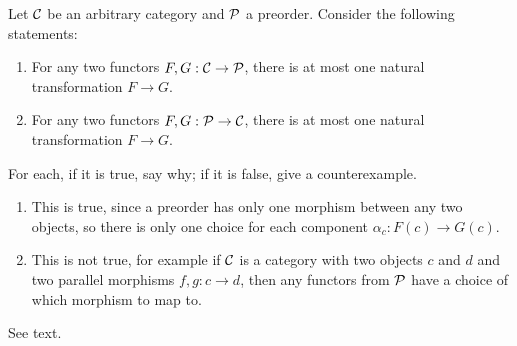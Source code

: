 Let $\mathcal{C}$ be an arbitrary category and $\mathcal{P}$ a preorder.  Consider the following statements:
\begin{enumerate}
	\item For any two functors $F,G:\mathcal{C}\to\mathcal{P}$, there is at most one natural transformation $F\to G$.
	\item For any two functors $F,G:\mathcal{P}\to\mathcal{C}$, there is at most one natural transformation $F\to G$.
\end{enumerate}
For each, if it is true, say why; if it is false, give a counterexample.

\solution
\begin{enumerate}
	\item This is true, since a preorder has only one morphism between any two objects, so there is only one choice for each component $\alpha_c:F(c)\to G(c)$.
	\item This is not true, for example if $\mathcal{C}$ is a category with two objects $c$ and $d$ and two parallel morphisms $f,g:c\to d$, then any functors from $\mathcal{P}$ have a choice of which morphism to map to.
\end{enumerate}

See text.







